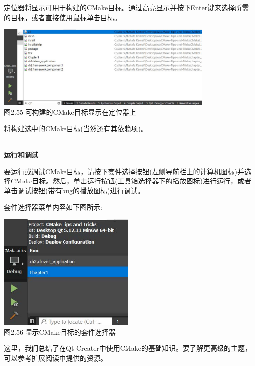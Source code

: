 定位器将显示可用于构建的CMake目标。通过高亮显示并按下Enter键来选择所需的目标，或者直接使用鼠标单击目标。

\begin{center}
\includegraphics[width=0.8\textwidth]{content/1/chapter2/images/55.jpg}\\
图2.55 可构建的CMake目标显示在定位器上
\end{center}

将构建选中的CMake目标(当然还有其依赖项)。

\hspace*{\fill} \\ %
\noindent
\textbf{运行和调试}

要运行或调试CMake目标，请按下套件选择按钮(左侧导航栏上的计算机图标)并选择CMake目标。然后，单击运行按钮(工具箱选择器下的播放图标)进行运行，或者单击调试按钮(带有bug的播放图标)进行调试。

套件选择器菜单内容如下图所示:

\begin{center}
\includegraphics[width=0.5\textwidth]{content/1/chapter2/images/56.jpg}\\
图2.56 显示CMake目标的套件选择器
\end{center}

这里，我们总结了在Qt Creator中使用CMake的基础知识。要了解更高级的主题，可以参考扩展阅读中提供的资源。

















